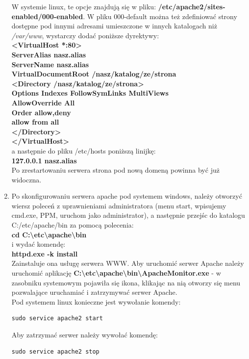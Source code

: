 \documentclass[a4paper,10pt]{article}
\begin{document}
\begin{enumerate}
W systemie linux, te opcje znajdują się w pliku: \textbf{/etc/apache2/sites-enabled/000-enabled}. W pliku 000-default można też zdefiniować strony dostępne pod innymi adresami umieszczone w innych katalogach niż \textit{/var/www}, wystarczy dodać poniższe dyrektywy: \\
\textbf{<VirtualHost *:80>\\
        ServerAlias nasz.alias\\
        ServerName nasz.alias\\
        VirtualDocumentRoot /nasz/katalog/ze/strona\\
        <Directory /nasz/katalog/ze/strona>\\
                Options Indexes FollowSymLinks MultiViews\\
                AllowOverride All\\
                Order allow,deny\\
                allow from all\\
        </Directory>\\
</VirtualHost>\\}
a następnie do pliku /etc/hosts poniższą linijkę: \\
\textbf{127.0.0.1 nasz.alias} \\
Po zrestartowaniu serwera strona pod nową domeną powinna być już widoczna.
\item Po skonfigurowaniu serwera apache pod systemem windows, należy otworzyć wiersz poleceń z uprawnieniami administratora (menu start, wpisujemy cmd.exe, PPM, uruchom jako administrator), a następnie przejśc do katalogu C:/etc/apache/bin za pomocą polecenia:\\
\textbf{cd C:\textbackslash etc\textbackslash apache\textbackslash bin}\\
i wydać komendę: \\
\textbf{httpd.exe -k install} \\
Zainstaluje ona usługę serwera WWW. Aby uruchomić serwer Apache należy uruchomić aplikację \textbf{C:\textbackslash etc\textbackslash apache\textbackslash bin\textbackslash ApacheMonitor.exe} - w zasobniku systemowym pojawiła się ikona, klikając na nią otworzy się menu pozwalające uruchamiać i zatrzymywać serwer Apache. \\
Pod systemem linux konieczne jest wywołanie komendy: \\
\begin{verbatim}
sudo service apache2 start
\end{verbatim}
Aby zatrzymać serwer należy wywołać komendę: \\
\begin{verbatim}
sudo service apache2 stop
\end{verbatim}
\end{enumerate}
\end{document}
